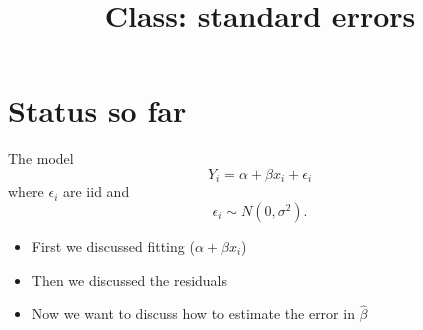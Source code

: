 \documentclass{article}
\begin{document}
\title{Class: standard errors}

\section{Status so far}

The model
\begin{displaymath}
Y_i = \alpha + \beta x_i + \epsilon_i 
\end{displaymath}
where $\epsilon_i$ are iid and
\begin{displaymath}
\epsilon_i \sim N(0,\sigma^2).
\end{displaymath}

\begin{itemize}
\item First we discussed fitting ($\alpha + \beta x_i$)
\item Then we discussed the residuals
\item Now we want to discuss how to estimate the error in $\hat\beta$
\end{itemize}
\end{document}
